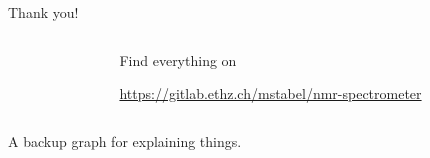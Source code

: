 \documentclass{ethpresentation}
\begin{document}
\begin{frame}{Thank you!}
  \begin{columns}
    \begin{column}{0.5\textwidth}
      \centering
      
    \end{column}
    \begin{column}{0.5\textwidth}
      \centering
      Find everything on \\ \vspace*{\baselineskip}

      

      \url{https://gitlab.ethz.ch/mstabel/nmr-spectrometer}
    \end{column}
  \end{columns}
\end{frame}

\appendix

\begin{frame}[standout]
  A backup graph for explaining things.
\end{frame}
\end{document}
